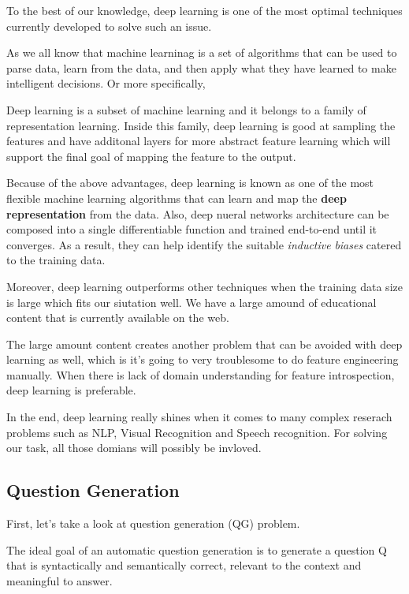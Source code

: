 \documentclass[]{book}
\theoremstyle{definition}
\theoremstyle{definition}
\theoremstyle{definition}
\theoremstyle{remark}
\begin{document}
To the best of our knowledge, deep learning is one of the most optimal
techniques currently developed to solve such an issue.

As we all know that machine learninag is a set of algorithms that can be
used to parse data, learn from the data, and then apply what they have
learned to make intelligent decisions. Or more specifically,

Deep learning is a subset of machine learning and it belongs to a family
of representation learning. Inside this family, deep learning is good at
sampling the features and have additonal layers for more abstract
feature learning which will support the final goal of mapping the
feature to the output.

Because of the above advantages, deep learning is known as one of the
most flexible machine learning algorithms that can learn and map the
\textbf{deep representation} from the data. Also, deep nueral networks
architecture can be composed into a single differentiable function and
trained end-to-end until it converges. As a result, they can help
identify the suitable \emph{inductive} \emph{biases} catered to the
training data.

Moreover, deep learning outperforms other techniques when the training
data size is large which fits our siutation well. We have a large amound
of educational content that is currently available on the web.

The large amount content creates another problem that can be avoided
with deep learning as well, which is it's going to very troublesome to
do feature engineering manually. When there is lack of domain
understanding for feature introspection, deep learning is preferable.

In the end, deep learning really shines when it comes to many complex
reserach problems such as NLP, Visual Recognition and Speech
recognition. For solving our task, all those domians will possibly be
invloved.

\subsection{Question Generation}\label{question-generation}

First, let's take a look at question generation (QG) problem.

The ideal goal of an automatic question generation is to generate a
question Q that is syntactically and semantically correct, relevant to
the context and meaningful to answer.
\end{document}
